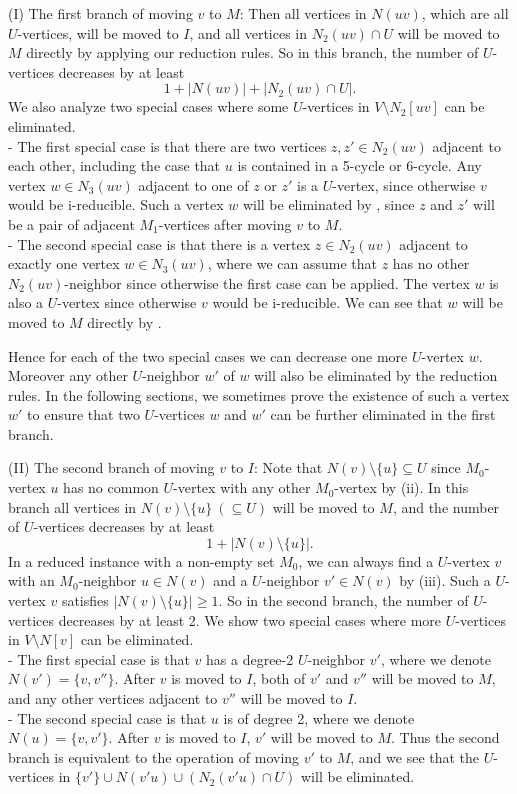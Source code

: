 \documentclass{elsart_TR2}
\begin{document}
(I) The first branch of moving  $v$  to $M$:
Then all vertices in $N(uv)$, which are all $U$-vertices,
 will be moved to $I$, and all vertices in $N_2(uv)\cap U$ will be moved to $M$ directly by applying our reduction rules.
So in this branch, the number of $U$-vertices decreases by at least
$$1+|N(uv)|+|N_2(uv)\cap U|.$$
We also analyze two special cases where  some  $U$-vertices in $V\setminus N_2[uv]$ can be eliminated. \\
\noindent
- The first special case is that there are two vertices $z,z'\in N_2(uv)$ adjacent to each other,
 including the case that $u$ is contained in a 5-cycle or 6-cycle.
Any vertex $w\in N_3(uv)$ adjacent to one of $z$ or $z'$ is
 a $U$-vertex, since otherwise $v$ would be i-reducible.
Such a vertex $w$ will be eliminated by , since $z$ and $z'$ will be a pair of adjacent $M_1$-vertices after moving $v$ to $M$.
\\
\noindent - The second special case is that there is a vertex $z\in N_2(uv)$ adjacent to exactly
one vertex $w\in N_3(uv)$, where we can assume that $z$ has no  other  $N_2(uv)$-neighbor
 since otherwise  the first case can be applied.
The vertex $w$ is also a $U$-vertex since otherwise $v$ would be i-reducible.
We can see that $w$ will be moved to $M$ directly by .

Hence for each of the two special cases we can decrease one more $U$-vertex $w$.
Moreover any other $U$-neighbor $w'$ of $w$ will also be eliminated by the reduction rules.
In the following sections,  we  sometimes prove the existence of such a vertex $w'$
to ensure that two $U$-vertices $w$ and $w'$ can be further eliminated in the first branch.

(II) The second branch of moving  $v$  to $I$:
Note that $N(v)\setminus\{u\}\subseteq U$ since $M_0$-vertex $u$ has no common $U$-vertex with any other $M_0$-vertex by (ii).
In this branch all vertices in $N(v)\setminus\{u\}~(\subseteq U)$ will be moved to $M$, and the number of $U$-vertices decreases by at least
$$1+|N(v)\setminus\{u\}|.$$
In a reduced instance with a non-empty set $M_0$, we can always find
a $U$-vertex $v$ with  an $M_0$-neighbor $u\in N(v)$ and a $U$-neighbor $v'\in N(v)$ by (iii).
Such a $U$-vertex $v$ satisfies
$|N(v)\setminus\{u\}|\geq 1$.
So in the second branch, the number of $U$-vertices decreases by at least 2.
We show two special cases where  more $U$-vertices in $V\setminus N[v]$ can be eliminated.\\
\noindent -
The first special case is that $v$ has a degree-2 $U$-neighbor $v'$, where  we denote $N(v')=\{v,v''\}$.
After $v$ is moved to $I$, both of $v'$ and $v''$ will be moved to $M$, and any other vertices adjacent to $v''$ will be moved to $I$. \\
\noindent - The second special case is that $u$ is of degree 2, where  we denote $N(u)=\{v,v'\}$.
 After $v$ is moved to $I$, $v'$ will be moved to $M$.
Thus the second branch is equivalent to the operation of moving $v'$ to $M$,
and we see that  the $U$-vertices in $\{v'\}\cup N(v'u) \cup (N_2(v'u)\cap U)$ will be eliminated.
\end{document}

